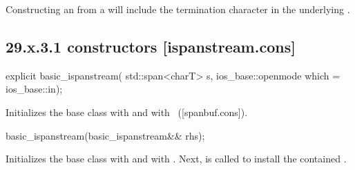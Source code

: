\documentclass[ebook,11pt,article]{memoir}
\renewcommand{\iref}[1]{[#1]}
\begin{document}
\pnum
\begin{note}
Constructing an  from a  will include the termination character  in the underlying .
\end{note}


\subsection{29.x.3.1  constructors [ispanstream.cons]}
\label{ispanstream.cons}

\begin{itemdecl}
explicit basic_ispanstream(
  std::span<charT> s,
  ios_base::openmode which = ios_base::in);
\end{itemdecl}

\begin{itemdescr}
\pnum
\effects
Initializes the base class with
and  with
~(\iref{spanbuf.cons}).
\end{itemdescr}

\begin{itemdecl}
basic_ispanstream(basic_ispanstream&& rhs);
\end{itemdecl}

\begin{itemdescr}
\pnum
\effects 
Initializes the base class with  
and  with .
Next,  is called to
install the contained .
\end{itemdescr}
\end{document}
